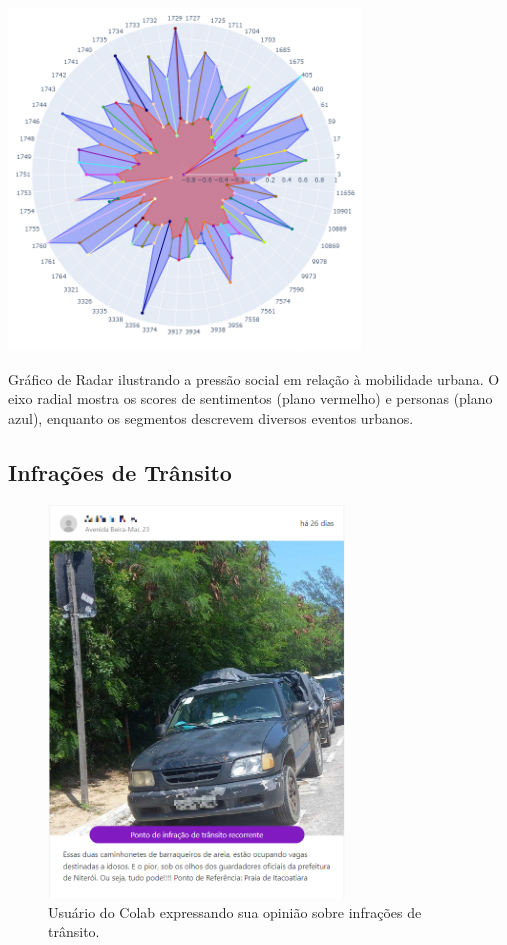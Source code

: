 \begin{quadro}[htb]
	\centering
	\includegraphics[width=0.7\textwidth]{images/social_barometer_mobility.png}
	\caption{Gráfico de Radar ilustrando a pressão social em relação à mobilidade urbana. O eixo radial mostra os scores de sentimentos (plano vermelho) e personas (plano azul), enquanto os segmentos descrevem diversos eventos urbanos.}
	\label{fig:social_barometer_mobility}
\end{quadro}

\subsection{Infrações de Trânsito}
\label{sec:eventos_populares_traffic}

\begin{figure}[htb]
	\centering
	\includegraphics[width=0.7\textwidth]{images/colab_posts_traffic.png}
	\caption{Usuário do Colab expressando sua opinião sobre infrações de trânsito.}
	\label{fig:colab_posts_traffic}
\end{figure}

